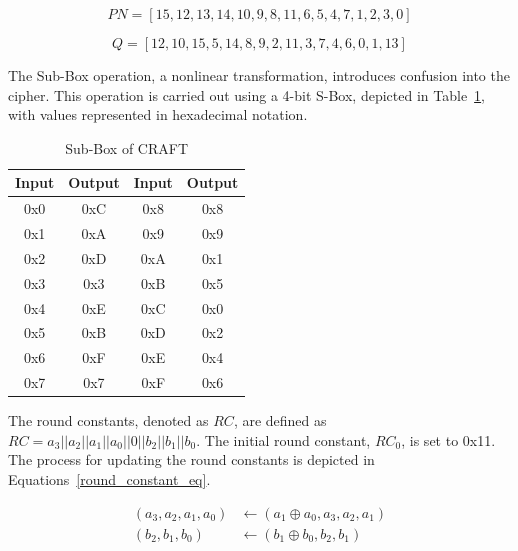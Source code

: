 \documentclass[final,5p,times,twocolumn]{elsarticle}
\begin{document}
\begin{equation}
    PN=[15,12,13,14,10,9,8,11,6,5,4,7,1,2,3,0]
    \label{permute_nibb_eq}
\end{equation}

\begin{equation}
    Q=[12,10,15,5,14,8,9,2,11,3,7,4,6,0,1,13]
    \label{key_schedule_eq}
\end{equation}

The Sub-Box operation, a nonlinear transformation, introduces confusion into the cipher. This operation is carried out using a 4-bit S-Box, depicted in Table~\ref{tab4}, with values represented in hexadecimal notation.

\begin{table}[h]
    \centering
    \caption{Sub-Box of CRAFT}\label{tab4}%
    \begin{tabular}{|c|c|c|c|}
        \hline
        Input & Output & Input & Output \\
        \hline
        0x0   & 0xC    & 0x8   & 0x8    \\
        0x1   & 0xA    & 0x9   & 0x9    \\
        0x2   & 0xD    & 0xA   & 0x1    \\
        0x3   & 0x3    & 0xB   & 0x5    \\
        0x4   & 0xE    & 0xC   & 0x0    \\
        0x5   & 0xB    & 0xD   & 0x2    \\
        0x6   & 0xF    & 0xE   & 0x4    \\
        0x7   & 0x7    & 0xF   & 0x6    \\
        \hline
    \end{tabular}
\end{table}

The round constants, denoted as $RC$, are defined as $RC=a_3||a_2||a_1||a_0||0||b_2||b_1||b_0$. The initial round constant, $RC_0$, is set to 0x11. The process for updating the round constants is depicted in Equations~\ref{round_constant_eq}.

\begin{equation}
    \begin{split}
        (a_3,a_2,a_1,a_0) & \gets (a_1 \oplus a_0,a_3,a_2,a_1)                    \\
        (b_2,b_1,b_0) & \gets (b_1\oplus b_0,b_2,b_1)   \\
    \end{split}
    \label{round_constant_eq}
\end{equation}
\end{document}
